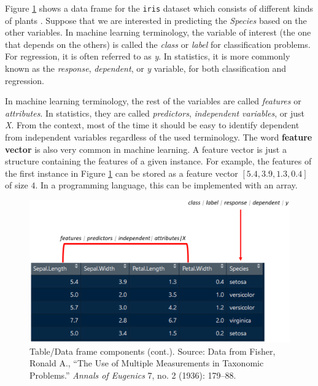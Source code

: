\documentclass[
  11pt,
]{krantz}
\begin{document}
Figure \ref{fig:terminology2} shows a data frame for the \texttt{iris} dataset which consists of different kinds of plants \citep{Fisher1936}. Suppose that we are interested in predicting the \emph{Species} based on the other variables. In machine learning terminology, the variable of interest (the one that depends on the others) is called the \emph{class} or \emph{label} for classification problems. For regression, it is often referred to as \emph{y}. In statistics, it is more commonly known as the \emph{response}, \emph{dependent}, or \emph{y} variable, for both classification and regression.

In machine learning terminology, the rest of the variables are called \emph{features} or \emph{attributes}. In statistics, they are called \emph{predictors}, \emph{independent variables}, or just \emph{X}. From the context, most of the time it should be easy to identify dependent from independent variables regardless of the used terminology. The word \textbf{feature vector} is also very common in machine learning. A feature vector is just a structure containing the features of a given instance. For example, the features of the first instance in Figure \ref{fig:terminology2} can be stored as a feature vector \([5.4,3.9,1.3,0.4]\) of size \(4\). In a programming language, this can be implemented with an array.



\begin{figure}

{\centering \includegraphics[width=0.9\linewidth]{images/terminologyTable2} 

}

\caption{Table/Data frame components (cont.). Source: Data from Fisher, Ronald A., ``The Use of Multiple Measurements in Taxonomic Problems.'' \emph{Annals of Eugenics} 7, no. 2 (1936): 179--88.}\label{fig:terminology2}
\end{figure}
\end{document}
